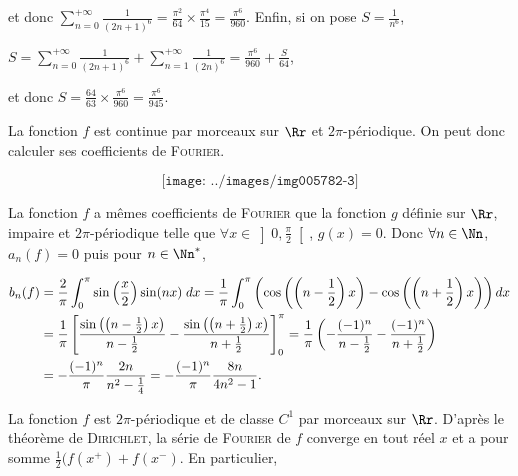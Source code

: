 {{et donc $\sum_{n=0}^{+\infty}\frac{1}{(2n+1)^6}=\frac{\pi^2}{64}\times\frac{\pi^4}{15}=\frac{\pi^6}{960}$. Enfin, si on pose $S=\frac{1}{n^6}$,

\begin{center}
$S=\sum_{n=0}^{+\infty}\frac{1}{(2n+1)^6}+\sum_{n=1}^{+\infty}\frac{1}{(2n)^6}=\frac{\pi^6}{960}+\frac{S}{64}$,
\end{center}

et donc $S=\frac{64}{63}\times\frac{\pi^6}{960}=\frac{\pi^6}{945}$.

\begin{center}
\end{center}
La fonction $f$ est continue par morceaux sur $\Rr$ et $2\pi$-périodique. On peut donc calculer ses coefficients de \textsc{Fourier}.

$$\texttt{[image: ../images/img005782-3]}$$


La fonction $f$ a mêmes coefficients de \textsc{Fourier} que la fonction $g$ définie sur $\Rr$, impaire et $2\pi$-périodique telle que $\forall x\in\left]0,\frac{\pi}{2}\right[$, $g(x)=0$. Donc $\forall n\in\Nn$, $a_n(f)=0$ puis pour $n\in\Nn^*$,

\begin{align*}\ensuremath
b_n(f)&=\frac{2}{\pi}\int_{0}^{\pi}\sin\left(\frac{x}{2}\right)\sin(nx)\;dx=\frac{1}{\pi}\int_{0}^{\pi}\left(\cos\left(\left(n-\frac{1}{2}\right)x\right)-\cos\left(\left(n+\frac{1}{2}\right)x\right)\right)dx\\
 &=\frac{1}{\pi}\left[\frac{\sin\left(\left(n-\frac{1}{2}\right)x\right)}{n-\frac{1}{2}}-\frac{\sin\left(\left(n+\frac{1}{2}\right)x\right)}{n+\frac{1}{2}}\right]_0^\pi=\frac{1}{\pi}\left(-\frac{(-1)^n}{n-\frac{1}{2}}-\frac{(-1)^n}{n+\frac{1}{2}}\right)\\
 &=-\frac{(-1)^n}{\pi}\frac{2n}{n^2-\frac{1}{4}}=-\frac{(-1)^n}{\pi}\frac{8n}{4n^2-1}.
\end{align*}

La fonction $f$ est $2\pi$-périodique et de classe $C^1$ par morceaux sur $\Rr$. D'après le théorème de \textsc{Dirichlet}, la série de \textsc{Fourier} de $f$ converge en tout réel $x$ et a pour somme $\frac{1}{2}(f(x^+)+f(x^-)$. En particulier,

\begin{center}
\shadowbox{
$\forall x\in]-\pi,\pi[$, $\sin\left(\frac{x}{2}\right)=-\frac{8}{\pi}\sum_{n=1}^{+\infty}(-1)^n\frac{n}{4n^2-1}\sin(nx)$.
}
\end{center}

}}
